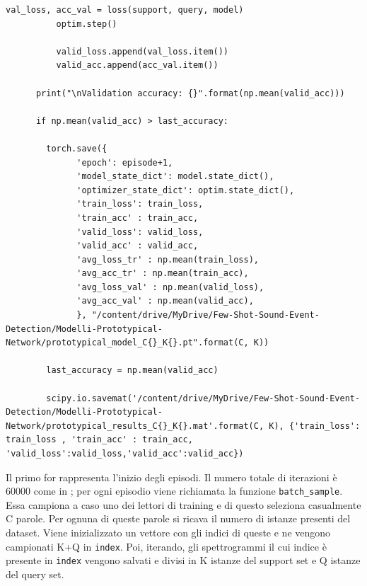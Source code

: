 \documentclass[12pt,a4paper,titlepage]{article}
\begin{document}
\begin{lstlisting}[language=iPython,firstnumber=1, caption=protonet\_training.py, label=protonet_training main,captionpos=b]
          val_loss, acc_val = loss(support, query, model)
          optim.step()
          
          valid_loss.append(val_loss.item())
          valid_acc.append(acc_val.item())

      print("\nValidation accuracy: {}".format(np.mean(valid_acc)))

      if np.mean(valid_acc) > last_accuracy: 

        torch.save({
              'epoch': episode+1,
              'model_state_dict': model.state_dict(),
              'optimizer_state_dict': optim.state_dict(),
              'train_loss': train_loss,
              'train_acc' : train_acc,              
              'valid_loss': valid_loss,
              'valid_acc' : valid_acc,
              'avg_loss_tr' : np.mean(train_loss),
              'avg_acc_tr' : np.mean(train_acc),
              'avg_loss_val' : np.mean(valid_loss),
              'avg_acc_val' : np.mean(valid_acc),
              }, "/content/drive/MyDrive/Few-Shot-Sound-Event-Detection/Modelli-Prototypical-Network/prototypical_model_C{}_K{}.pt".format(C, K))
        
        last_accuracy = np.mean(valid_acc)

        scipy.io.savemat('/content/drive/MyDrive/Few-Shot-Sound-Event-Detection/Modelli-Prototypical-Network/prototypical_results_C{}_K{}.mat'.format(C, K), {'train_loss': train_loss , 'train_acc' : train_acc, 'valid_loss':valid_loss,'valid_acc':valid_acc})
\end{lstlisting}
Il primo for rappresenta l'inizio degli episodi.
Il numero totale di iterazioni è 60000 come in \cite{Salamon:Few-Shot}; per ogni episodio viene richiamata la funzione \texttt{batch\_sample}.
Essa campiona a caso uno dei lettori di training e di questo seleziona casualmente C parole.
Per ognuna di queste parole si ricava il numero di istanze presenti del dataset.
Viene inizializzato un vettore con gli indici di queste e ne vengono campionati K+Q in \texttt{index}. Poi, iterando, gli spettrogrammi il cui indice è presente in \texttt{index} vengono salvati e divisi in K istanze del support set e Q istanze del query set.
\end{document}
